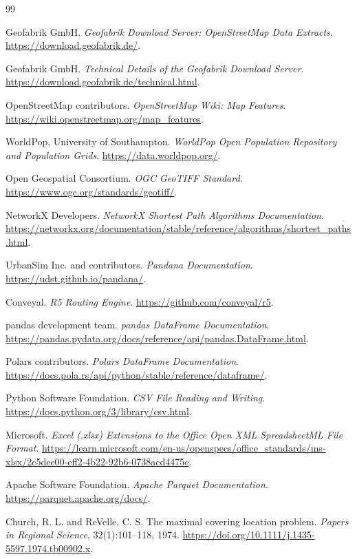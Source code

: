 \documentclass[11pt]{article}
\begin{document}
\begin{thebibliography}{99}

Geofabrik GmbH.
\newblock \emph{Geofabrik Download Server: OpenStreetMap Data Extracts}.
\newblock \url{https://download.geofabrik.de/}.

Geofabrik GmbH.
\newblock \emph{Technical Details of the Geofabrik Download Server}.
\newblock \url{https://download.geofabrik.de/technical.html}.

OpenStreetMap contributors.
\newblock \emph{OpenStreetMap Wiki: Map Features}.
\newblock \url{https://wiki.openstreetmap.org/map_features}.

WorldPop, University of Southampton.
\newblock \emph{WorldPop Open Population Repository and Population Grids}.
\newblock \url{https://data.worldpop.org/}.

Open Geospatial Consortium.
\newblock \emph{OGC GeoTIFF Standard}.
\newblock \url{https://www.ogc.org/standards/geotiff/}.

NetworkX Developers.
\newblock \emph{NetworkX Shortest Path Algorithms Documentation}.
\newblock \url{https://networkx.org/documentation/stable/reference/algorithms/shortest_paths.html}.

UrbanSim Inc. and contributors.
\newblock \emph{Pandana Documentation}.
\newblock \url{https://udst.github.io/pandana/}.

Conveyal.
\newblock \emph{R5 Routing Engine}.
\newblock \url{https://github.com/conveyal/r5}.

pandas development team.
\newblock \emph{pandas DataFrame Documentation}.
\newblock \url{https://pandas.pydata.org/docs/reference/api/pandas.DataFrame.html}.

Polars contributors.
\newblock \emph{Polars DataFrame Documentation}.
\newblock \url{https://docs.pola.rs/api/python/stable/reference/dataframe/}.

Python Software Foundation.
\newblock \emph{CSV File Reading and Writing}.
\newblock \url{https://docs.python.org/3/library/csv.html}.

Microsoft.
\newblock \emph{Excel (.xlsx) Extensions to the Office Open XML SpreadsheetML File Format}.
\newblock \url{https://learn.microsoft.com/en-us/openspecs/office_standards/ms-xlsx/2c5dee00-eff2-4b22-92b6-0738acd4475e}.

Apache Software Foundation.
\newblock \emph{Apache Parquet Documentation}.
\newblock \url{https://parquet.apache.org/docs/}.

Church, R. L. and ReVelle, C. S.
\newblock The maximal covering location problem.
\newblock \emph{Papers in Regional Science}, 32(1):101--118, 1974.
\newblock \url{https://doi.org/10.1111/j.1435-5597.1974.tb00902.x}.

\end{thebibliography}
\end{document}
